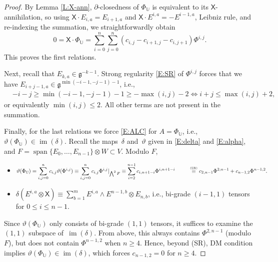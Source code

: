 \documentclass[pdftex]{sigma}%
\newcommand\tensor{\otimes}
\DeclareMathOperator{\img}{im}
\DeclareMathOperator{\sn}{span}
\newcommand\fg{\mathfrak{g}}
\newcommand\bbU{\mathbb{U}}
\newcommand\sfX{\mathsf{X}}
\numberwithin{equation}{section}
\begin{document}
\begin{proof}
 By Lemma \ref{L:X-ann}, $\partial$-closedness of $\Phi_\bbU$ is equivalent to its $\sfX$-annihilation, so using $\sfX \cdot E_{i,a} = E_{i+1,a}$ and $\sfX \cdot E^{i,a} = -E^{i-1,a}$, Leibniz rule, and re-indexing the summation, we straightforwardly obtain{\samepage
\[
0 = \sfX \cdot \Phi_{\bbU} = \sum_{i=0}^n \sum_{j=0}^n (c_{i,j}- c_{i+1,j} - c_{i,j+1})\Phi^{i,j}.
\]
This proves the first relations.}

Next, recall that $E_{k,a} \in \fg^{-k-1}$. Strong regularity \eqref{E:SR} of $\Phi^{i,j}$ forces that we have $E_{i+j-1,a} \in \fg^{\min(-i-1,-j-1)-1}$, i.e.,
\begin{align*}
&-i-j \ge \min( -i-1,-j-1)-1 \ge -\max(i,j)-2 \iff i+j \le \max(i,j)+2,
\end{align*}
or equivalently $\min(i,j) \leq 2$. All other terms are not present in the summation.

Finally, for the last relations we force \eqref{E:ALC} for $A=\Phi_\bbU$, i.e., $\vartheta(\Phi_\bbU) \in \img(\delta)$. Recall the maps~$\delta$ and~$\vartheta$ given in \eqref{E:delta} and \eqref{E:alpha}, and $F=\sn \{E_0,\dots,E_{n-1}\}\tensor W \subset V$. Modulo $F$,
 \begin{itemize}\itemsep=0pt
 \item $\displaystyle \vartheta(\Phi_\bbU) = \sum_{i,j=0}^n c_{i,j}\vartheta(\Phi^{i,j}) \equiv \sum_{i,j=0}^n c_{i,j}\Phi^{i,j}|_{\bigwedge^2F} \equiv \sum_{i=2}^{n-1} c_{i,n+1-i}\Phi^{i, n+1-i} \\ \hphantom{\vartheta(\Phi_\bbU\!)}\overset{\text{\tiny (SR)}}{\equiv} c_{2,n-1}\Phi^{2, n-1} + c_{n-1,2}\Phi^{n-1,2}.$
 \item $ \displaystyle \delta(E^{i,a} \tensor \sfX) \equiv \sum_{b=1}^m E^{i,a} \wedge E^{n-1,b} \tensor E_{n,b}$, i.e., bi-grade $(i-1,1)$ tensors for $0 \le i \le n-1$.
 \end{itemize}
 Since $\vartheta(\Phi_\bbU)$ only consists of bi-grade $(1,1)$ tensors, it suffices to examine the $(1,1)$ subspace of~$\img(\delta)$. From above, this always contains $\Phi^{2,n-1}$ (modulo $F$), but does not contain $\Phi^{n-1,2}$ when $n \geq 4$. Hence, beyond (SR), DM condition implies $\vartheta(\Phi_{\bbU}) \in \img(\delta)$, which forces $c_{n-1,2} = 0$ for $n \ge 4$.
\end{proof}
\end{document}
